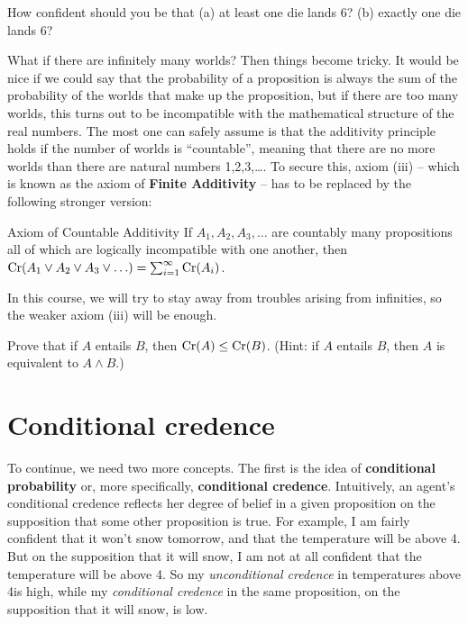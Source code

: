 \begin{exercise}
  How confident should you be that (a) at least one die lands 6?
  (b) exactly one die lands 6?
\end{exercise}

What if there are infinitely many worlds? Then things become
tricky. It would be nice if we could say that the probability of a
proposition is always the sum of the probability of the worlds that
make up the proposition, but if there are too many worlds, this turns
out to be incompatible with the mathematical structure of the real
numbers. The most one can safely assume is that the additivity
principle holds if the number of worlds is ``countable'', meaning that
there are no more worlds than there are natural numbers
1,2,3,\ldots. To secure this, axiom (iii) -- which is known as the
axiom of \textbf{Finite Additivity} -- has to be replaced by the
following stronger version:
%
\begin{genericthm}{Axiom of Countable Additivity} 
  If $A_1, A_2, A_3, \ldots$ are countably many propositions all of
  which are logically incompatible with one another, then $\text{Cr}(A_1
  \lor A_2 \lor A_3 \lor \ldots) = \sum_{i=1}^\infty \text{Cr}(A_i)$.
\end{genericthm}
%
In this course, we will try to stay away from troubles arising from
infinities, so the weaker axiom (iii) will be enough.

\begin{exercise}
  Prove that if $A$ entails $B$, then $\text{Cr}(A) \leq \text{Cr}(B)$. (Hint: if
  $A$ entails $B$, then $A$ is equivalent to $A \land B$.)
\end{exercise}


\section{Conditional credence}\label{sec:conditional}

To continue, we need two more concepts. The first is the idea of
\textbf{conditional probability} or, more specifically,
\textbf{conditional credence}.  Intuitively, an agent's conditional
credence reflects her degree of belief in a given proposition on the
supposition that some other proposition is true. For example, I am
fairly confident that it won't snow tomorrow, and that the temperature
will be above 4\celsius. But on the supposition that it will snow, I
am not at all confident that the temperature will be above
4\celsius. So my \emph{unconditional credence} in temperatures above
4\celsius is high, while my \emph{conditional credence} in the same
proposition, on the supposition that it will snow, is low.

